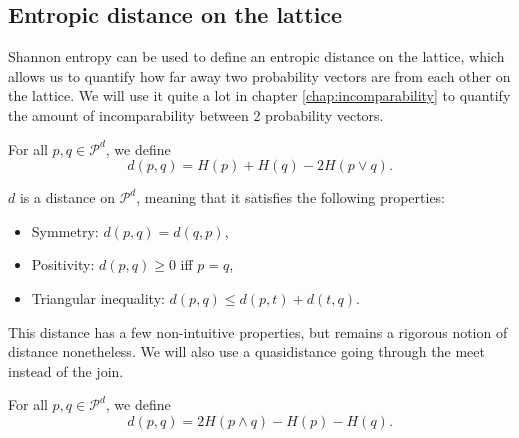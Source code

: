 \subsection{Entropic distance on the lattice} \label{sec:entropic_distances}

Shannon entropy can be used to define an entropic distance on the lattice, which allows us to quantify how far away two probability vectors are from each other on the lattice. We will use it quite a lot in chapter \ref{chap:incomparability} to quantify the amount of incomparability between 2 probability vectors.

\begin{definition} \label{def:entropic_distance}
    For all $p, q \in \mathcal{P}^d$, we define
    \begin{equation}
        d(p, q) = H(p) + H(q) - 2H(p \vee q).
    \end{equation}
\end{definition}

\begin{theorem}
    $d$ is a distance on $\mathcal{P}^d$, meaning that it satisfies the following properties:
    \begin{itemize}
        \item Symmetry: $d(p, q) = d(q, p)$,
        \item Positivity: $d(p, q) \geq 0$  iff $p = q$,
        \item Triangular inequality: $d(p, q) \leq d(p, t) + d(t, q)$.
    \end{itemize}
\end{theorem}

This distance has a few non-intuitive properties, but remains a rigorous notion of distance nonetheless. %
We will also use a quasidistance going through the meet instead of the join.

\begin{definition} \label{def:entropic_quasidistance}
    For all $p, q \in \mathcal{P}^d$, we define
    \begin{equation}
        d(p, q) = 2H(p \wedge q) - H(p) - H(q).
    \end{equation}
\end{definition}

